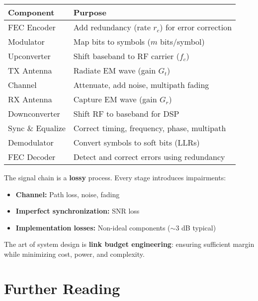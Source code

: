 \begin{center}
\begin{tabular}{@{}lp{9cm}@{}}
\toprule
\textbf{Component} & \textbf{Purpose} \\
\midrule
FEC Encoder & Add redundancy (rate $r_c$) for error correction \\
Modulator & Map bits to symbols ($m$ bits/symbol) \\
Upconverter & Shift baseband to RF carrier ($f_c$) \\
TX Antenna & Radiate EM wave (gain $G_t$) \\
Channel & Attenuate, add noise, multipath fading \\
RX Antenna & Capture EM wave (gain $G_r$) \\
Downconverter & Shift RF to baseband for DSP \\
Sync \& Equalize & Correct timing, frequency, phase, multipath \\
Demodulator & Convert symbols to soft bits (LLRs) \\
FEC Decoder & Detect and correct errors using redundancy \\
\bottomrule
\end{tabular}
\end{center}

\begin{keyconcept}
The signal chain is a \textbf{lossy} process. Every stage introduces impairments:
\begin{itemize}
\item \textbf{Channel:} Path loss, noise, fading
\item \textbf{Imperfect synchronization:} SNR loss
\item \textbf{Implementation losses:} Non-ideal components ($\sim$3 dB typical)
\end{itemize}

The art of system design is \textbf{link budget engineering}: ensuring sufficient margin while minimizing cost, power, and complexity.
\end{keyconcept}

\section{Further Reading}

